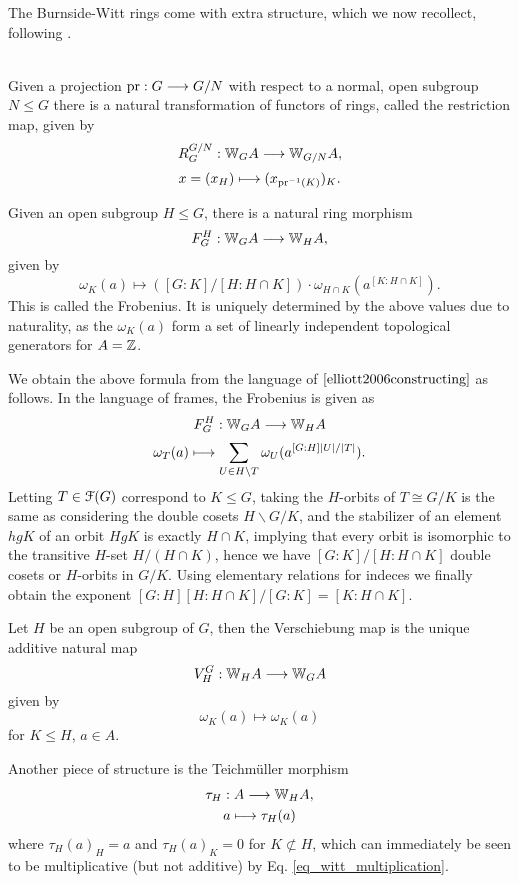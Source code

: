 %
%
The Burnside-Witt rings come with extra structure, which we now recollect, following \cite{elliott2006constructing}.\\
\\
\begin{defn}\label{def_witt_res}
Given a projection $\operatorname{pr}: G \longrightarrow G/N$ with respect to a normal, open subgroup $N \leq G$ there is a natural transformation of functors of rings, called the restriction map, given by
\[	R_G^{G/N}: \mathbb{W}_G A \longrightarrow \mathbb{W}_{G/N} A,\]
\[	x = (x_H) \longmapsto (x_{\operatorname{pr}^{-1}(K)})_K.	\]
\end{defn}
\begin{defn}\label{def_witt_frob}
Given an open subgroup $H \leq G$, there is a natural ring morphism
\[	F_G^H: \mathbb{W}_G A \longrightarrow \mathbb{W}_H A, \]
given by
\[	\omega_K(a) \mapsto ( [G:K]/[H: H \cap K]) \cdot \omega_{H \cap K} (a^{[K : H \cap K]}).	\]
This is called the Frobenius.  It is uniquely determined by the above values due to naturality, as the $\omega_K(a)$ form a set of linearly independent topological generators for $A = \mathbb{Z}$.
\end{defn}
\begin{rem}
We obtain the above formula from the language of $\cite{elliott2006constructing}$ as follows. In the language of frames, the Frobenius is given as
\[	F_G^H: \mathbb{W}_G A \longrightarrow \mathbb{W}_H A	\]
\[	\omega_T(a) \longmapsto \sum_{U \in H \backslash T} \omega_U( a^{ [G:H] \left\vert U\right\vert / \left\vert T\right\vert } ).\]
Letting $T \in \mathcal{F}(G)$ correspond to $K \leq G$, taking the $H$-orbits of $T \cong G/K$ is the same as considering the double cosets $H \backslash G / K$, and the stabilizer of an element $hgK$ of an orbit $HgK$ is exactly $H \cap K$, implying that every orbit is isomorphic to the transitive $H$-set $H/(H \cap K)$, hence we have $[G:K]/[H: H \cap K]$ double cosets or $H$-orbits in $G/K$. Using elementary relations for indeces we finally obtain the exponent $[G:H] [H:H \cap K] / [G:K] = [K : H \cap K]$.
\end{rem}
\begin{defn}\label{def_witt_vers}
Let $H$ be an open subgroup of $G$, then the Verschiebung map is the unique additive natural map
	\[	V_H^G : \mathbb{W}_H A \longrightarrow \mathbb{W}_G A \]
given by
	\[ \omega_K (a) \mapsto \omega_K (a) \]
for $K \leq H$, $a \in A$.
\end{defn}
%
%
\begin{defn}\label{def_teichmueller_burnside_witt_vectors}
Another piece of structure is the Teichm\"uller morphism
\begin{gather*}
	\tau_H: A \to \bW_H A,\\%
	a \mapsto \tau_H(a)
\end{gather*}
where $\tau_H(a)_H = a$ and $\tau_H(a)_K = 0$ for $K \not\subset H$, which can immediately be seen to be multiplicative (but not additive) by Eq. \ref{eq_witt_multiplication}.
\end{defn}
